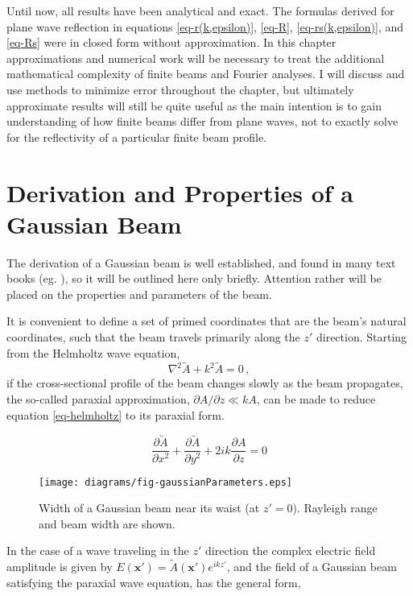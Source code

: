\documentclass[12pt]{uthesis-v12}
\begin{document}
Until now, all results have been analytical and exact. The formulas derived for plane wave reflection in equations \ref{eq-r(k,epsilon)}, \ref{eq-R}, \ref{eq-rs(k,epsilon)}, and \ref{eq-Rs} were in closed form without approximation.  In this chapter approximations and numerical work will be necessary to treat the additional mathematical complexity of finite beams and Fourier analyses. I will discuss and use methods to minimize error throughout the chapter, but ultimately approximate results will still be quite useful as the main intention is to gain understanding of how finite beams differ from plane waves, not to exactly solve for the reflectivity of a particular finite beam profile.

\section{Derivation and Properties of a Gaussian Beam}
The derivation of a Gaussian beam is well established, and found in many text books (eg. \cite{Boyd}), so it will be outlined here only briefly. Attention rather will be placed on the properties and parameters of the beam.

It is convenient to define a set of primed coordinates that are the beam's natural coordinates, such that the beam travels primarily along the $z'$ direction. Starting from the Helmholtz wave equation,
\begin{equation}\label{eq-helmholtz}
\nabla^2\tilde{A}+k^2\tilde{A}=0\,,
\end{equation}
if the cross-sectional profile of the beam changes slowly as the beam propagates, the so-called paraxial approximation, $\partial A/\partial z \ll kA$, can be made to reduce equation \ref{eq-helmholtz} to its paraxial form.

\begin{equation}\label{eq-paraxial}
\frac{\partial\tilde{A}}{\partial x^2}+\frac{\partial\tilde{A}}{\partial y^2}+2ik\frac{\partial A}{\partial z} =0
\end{equation}

\begin{figure}[htb]
\centering
\texttt{[image: diagrams/fig-gaussianParameters.eps]}
\caption[Gaussian beam diagram showing beam waist and Rayleigh range]{Width of a Gaussian beam near its waist (at $z'=0$). Rayleigh range and beam width are shown.
 \label{fig-gaussianParameters}}
\end{figure}

In the case of a wave traveling in the $z'$ direction the complex electric field amplitude is given by $E(\mathbf{x'})=\tilde{A}(\mathbf{x'})e^{ikz'}$, and the field of a Gaussian beam  satisfying the paraxial wave equation, has the general form,
\end{document}

